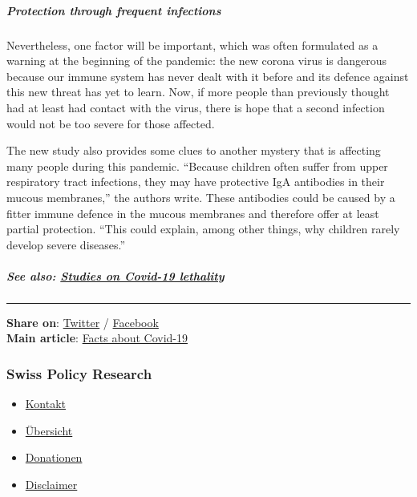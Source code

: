 \hypertarget{protection-through-frequent-infections}{%
\subparagraph{\texorpdfstring{\textbf{Protection through frequent
infections}}{Protection through frequent infections}}\label{protection-through-frequent-infections}}

Nevertheless, one factor will be important, which was often formulated
as a warning at the beginning of the pandemic: the new corona virus is
dangerous because our immune system has never dealt with it before and
its defence against this new threat has yet to learn. Now, if more
people than previously thought had at least had contact with the virus,
there is hope that a second infection would not be too severe for those
affected.

The new study also provides some clues to another mystery that is
affecting many people during this pandemic. ``Because children often
suffer from upper respiratory tract infections, they may have protective
IgA antibodies in their mucous membranes,'' the authors write. These
antibodies could be caused by a fitter immune defence in the mucous
membranes and therefore offer at least partial protection. ``This could
explain, among other things, why children rarely develop severe
diseases.''

\hypertarget{see-also-studies-on-covid-19-lethality}{%
\subparagraph{\texorpdfstring{\textbf{See also}:
\href{https://swprs.org/studies-on-covid-19-lethality/}{Studies on
Covid-19
lethality}}{See also: Studies on Covid-19 lethality}}\label{see-also-studies-on-covid-19-lethality}}

\begin{center}\rule{0.5\linewidth}{\linethickness}\end{center}

\textbf{Share on}:
\href{https://twitter.com/intent/tweet?url=https://swprs.org/coronavirus-antibody-tests-show-only-one-fifth-of-infections/}{Twitter}
/
\href{https://www.facebook.com/share.php?u=https://swprs.org/coronavirus-antibody-tests-show-only-one-fifth-of-infections/}{Facebook}\\
\textbf{Main article}:
\href{https://swprs.org/a-swiss-doctor-on-covid-19/}{Facts about
Covid-19}

\hypertarget{swiss-policy-research}{%
\subsubsection{Swiss Policy Research}\label{swiss-policy-research}}

\begin{itemize}
\tightlist
\item
  \href{https://swprs.org/kontakt/}{Kontakt}
\item
  \href{https://swprs.org/uebersicht/}{Übersicht}
\item
  \href{https://swprs.org/donationen/}{Donationen}
\item
  \href{https://swprs.org/disclaimer/}{Disclaimer}
\end{itemize}

